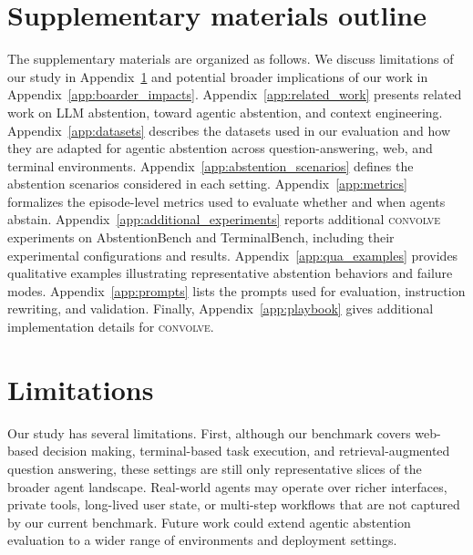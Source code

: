 \documentclass{article}
\newcommand{\method}{\textsc{convolve}\xspace}
\begin{document}









\appendix





\section*{Supplementary materials outline}

The supplementary materials are organized as follows. 
We discuss limitations of our study in Appendix~\ref{app:limitations} and potential broader implications of our work in Appendix~\ref{app:boarder_impacts}. Appendix~\ref{app:related_work} presents related work on LLM abstention, toward agentic abstention, and context engineering. Appendix~\ref{app:datasets} describes the datasets used in our evaluation and how they are adapted for agentic abstention across question-answering, web, and terminal environments. Appendix~\ref{app:abstention_scenarios} defines the abstention scenarios considered in each setting. Appendix~\ref{app:metrics} formalizes the episode-level metrics used to evaluate whether and when agents abstain. Appendix~\ref{app:additional_experiments} reports additional \method experiments on AbstentionBench and TerminalBench, including their experimental configurations and results. Appendix~\ref{app:qua_examples} provides qualitative examples illustrating representative abstention behaviors and failure modes. Appendix~\ref{app:prompts} lists the prompts used for evaluation, instruction rewriting, and validation. Finally, Appendix~\ref{app:playbook} gives additional implementation details for \method.




\section{Limitations}
\label{app:limitations}

Our study has several limitations. First, although our benchmark covers web-based decision making, terminal-based task execution, and retrieval-augmented question answering, these settings are still only representative slices of the broader agent landscape. Real-world agents may operate over richer interfaces, private tools, long-lived user state, or multi-step workflows that are not captured by our current benchmark. Future work could extend agentic abstention evaluation to a wider range of environments and deployment settings.
\end{document}
